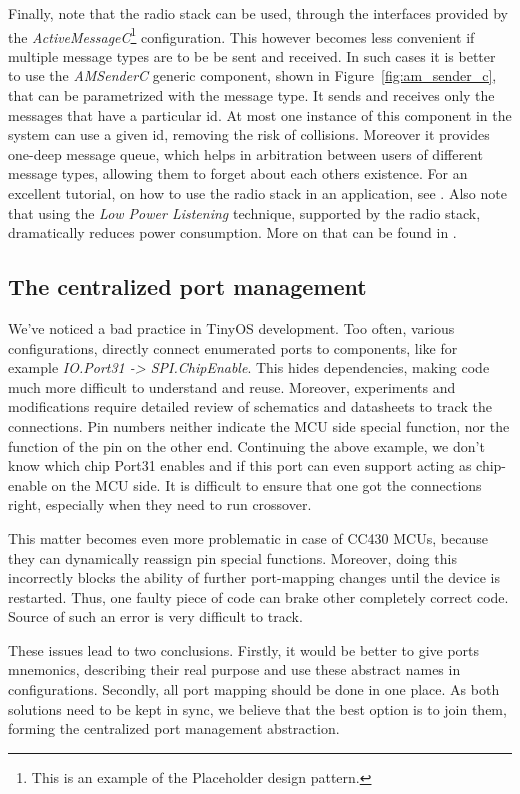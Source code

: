 Finally, note that the radio stack can be used, through the interfaces provided by the \emph{ActiveMessageC}\footnote{This is an example of the Placeholder design pattern.} configuration. This however becomes less convenient if multiple message types are to be be sent and received. In such cases it is better to use the \emph{AMSenderC} generic component, shown in Figure~\ref{fig:am_sender_c}, that can be parametrized with the message type. It sends and receives only the messages that have a particular id. At most one instance of this component in the system can use a given id, removing the risk of collisions. Moreover it provides one-deep message queue, which helps in arbitration between users of different message types, allowing them to forget about each others existence. For an excellent tutorial, on how to use the radio stack in an application, see \cite{MoteToMote}. Also note that using the \emph{Low Power Listening} technique, supported by the radio stack, dramatically reduces power consumption. More on that can be found in \cite{LowPowerApps}.


\subsection{The centralized port management}

We've noticed a bad practice in TinyOS development. Too often, various configurations, directly connect enumerated ports to components, like for example \emph{IO.Port31 -> SPI.ChipEnable}. This hides dependencies, making code much more difficult to understand and reuse. Moreover, experiments and modifications require detailed review of schematics and datasheets to track the connections. Pin numbers neither indicate the MCU side special function, nor the function of the pin on the other end. Continuing the above example, we don't know which chip Port31 enables and if this port can even support acting as chip-enable on the MCU side. It is difficult to ensure that one got the connections right, especially when they need to run crossover.

This matter becomes even more problematic in case of CC430 MCUs, because they can dynamically reassign pin special functions. Moreover, doing this incorrectly blocks the ability of further port-mapping changes until the device is restarted. Thus, one faulty piece of code can brake other completely correct code. Source of such an error is very difficult to track.

These issues lead to two conclusions. Firstly, it would be better to give ports mnemonics, describing their real purpose and use these abstract names in configurations. Secondly, all port mapping should be done in one place. As both solutions need to be kept in sync, we believe that the best option is to join them, forming the centralized port management abstraction.

